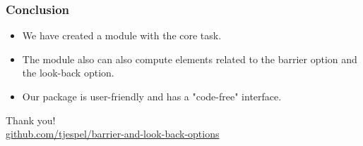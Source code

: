 \documentclass[12pt]{beamer}
\begin{document}
\begin{frame}
\frametitle{Conclusion}
\begin{itemize}
  \item We have created a module with the core task.
  \item The module also can also compute elements related to the barrier option and the look-back option.
  \item Our package is user-friendly and has a "code-free" interface.
\end{itemize}
\end{frame}



\begin{frame}

\centering
{\Large Thank you!}
\\[1cm]
{\small\url{github.com/tjespel/barrier-and-look-back-options}}
\end{frame}
\end{document}
